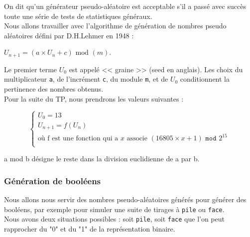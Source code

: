 


On dit qu'un générateur pseudo-aléatoire est acceptable s'il a passé avec succès toute une série de tests de statistiques généraux.\\

Nous allons travailler avec l'algorithme de génération de nombres pseudo aléatoires défini par D.H.Lehmer en 1948 : 
\begin{center}
$U_{n+1}=(a \times U_n+c)\text{ mod }(m)$.
\end{center}
Le premier terme $U_0$ est appelé << graine >> (seed en anglais). Les choix du multiplicateur \texttt{a}, de l'incrément \texttt{c}, du module \texttt{m}, et de $U_0$ conditionnent la pertinence des nombres obtenus.\\

Pour la suite du TP, nous prendrons les valeurs suivantes :

$$\left\{ \begin{array}{l}
   U_0=13  \\
   U_{n+1}=f( U_{n})\\
\mbox{où f est une fonction qui a } x \mbox{ associe }
(16805 \times x+1)\texttt{ mod }2^{15}  \\
\end{array} \right.$$

\begin{center}
a mod b désigne le reste dans la division euclidienne de a par b.
\end{center}







\subsubsection*{Génération de booléens}
Nous allons nous servir des nombres pseudo-aléatoires générés pour générer des booléens, par exemple pour simuler une suite de tirages à \texttt{pile} ou \texttt{face}.\\
Nous avons deux situations possibles : soit \texttt{pile}, soit \texttt{face} que l'on peut rapprocher du "0" et du "1" de la représentation binaire.

